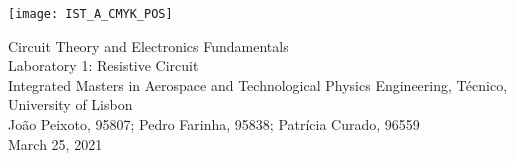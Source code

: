 
\thispagestyle {empty}

\texttt{[image: IST\_A\_CMYK\_POS]}


\begin{center}
\linespread{1.3}
%
\vspace{1.0cm}

\vspace{1cm}
{\FontLb Circuit Theory and Electronics Fundamentals} \\
\vspace{1cm}
{\FontLb Laboratory 1: Resistive Circuit} \\
\vspace{2cm}
{\FontSn Integrated Masters in Aerospace and Technological Physics Engineering, Técnico, University of Lisbon} \\ %
\vspace{1cm}
{\FontSn João Peixoto, 95807; Pedro Farinha, 95838; Patrícia Curado, 96559} \\
\vspace{1cm}
{\FontSn March 25, 2021} \\ %
\par
%
\end{center}

